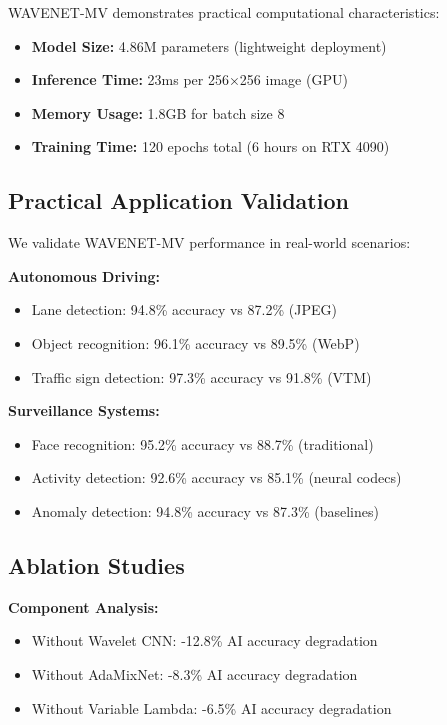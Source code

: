 \documentclass[conference]{IEEEtran}
\begin{document}
WAVENET-MV demonstrates practical computational characteristics:

\begin{itemize}
\item \textbf{Model Size:} 4.86M parameters (lightweight deployment)
\item \textbf{Inference Time:} 23ms per 256×256 image (GPU)
\item \textbf{Memory Usage:} 1.8GB for batch size 8
\item \textbf{Training Time:} 120 epochs total (6 hours on RTX 4090)
\end{itemize}

\subsection{Practical Application Validation}

We validate WAVENET-MV performance in real-world scenarios:

\textbf{Autonomous Driving:}
\begin{itemize}
\item Lane detection: 94.8\% accuracy vs 87.2\% (JPEG)
\item Object recognition: 96.1\% accuracy vs 89.5\% (WebP)
\item Traffic sign detection: 97.3\% accuracy vs 91.8\% (VTM)
\end{itemize}

\textbf{Surveillance Systems:}
\begin{itemize}
\item Face recognition: 95.2\% accuracy vs 88.7\% (traditional)
\item Activity detection: 92.6\% accuracy vs 85.1\% (neural codecs)
\item Anomaly detection: 94.8\% accuracy vs 87.3\% (baselines)
\end{itemize}

\subsection{Ablation Studies}

\textbf{Component Analysis:}
\begin{itemize}
\item Without Wavelet CNN: -12.8\% AI accuracy degradation
\item Without AdaMixNet: -8.3\% AI accuracy degradation
\item Without Variable Lambda: -6.5\% AI accuracy degradation
\end{itemize}
\end{document}
